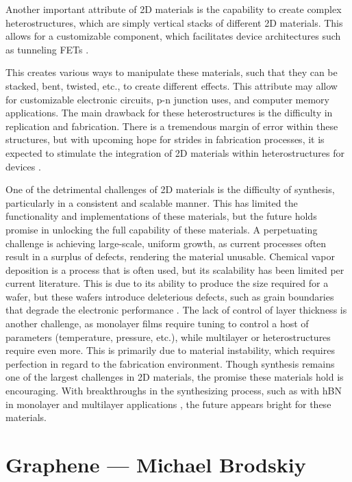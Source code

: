 \documentclass[conference]{IEEEtran}
\begin{document}
Another important attribute of 2D materials is the capability to create complex heterostructures, which are simply vertical stacks of different 2D materials. This allows for a customizable component, which facilitates device architectures such as tunneling FETs \cite{intro}. 

This creates various ways to manipulate these materials, such that they can be stacked, bent, twisted, etc., to create different effects. This attribute may allow for customizable electronic circuits, p-n junction uses, and computer memory applications. The main drawback for these heterostructures is the difficulty in replication and fabrication. There is a tremendous margin of error within these structures, but with upcoming hope for strides in fabrication processes, it is expected to stimulate the integration of 2D materials within heterostructures for devices \cite{jb3, oc1}.

One of the detrimental challenges of 2D materials is the difficulty of synthesis, particularly in a consistent and scalable manner. This has limited the functionality and implementations of these materials, but the future holds promise in unlocking the full capability of these materials. A perpetuating challenge is achieving large-scale, uniform growth, as current processes often result in a surplus of defects, rendering the material unusable. Chemical vapor deposition is a process that is often used, but its scalability has been limited per current literature. This is due to its ability to produce the size required for a wafer, but these wafers introduce deleterious defects, such as grain boundaries that degrade the electronic performance \cite{intro}. The lack of control of layer thickness is another challenge, as monolayer films require tuning to control a host of parameters (temperature, pressure, etc.), while multilayer or heterostructures require even more. This is primarily due to material instability, which requires perfection in regard to the fabrication environment. Though synthesis remains one of the largest challenges in 2D materials, the promise these materials hold is encouraging. With breakthroughs in the synthesizing process, such as with hBN in monolayer and multilayer applications \cite{jb3, oc1}, the future appears bright for these materials.

\section{Graphene — Michael Brodskiy}
\end{document}
